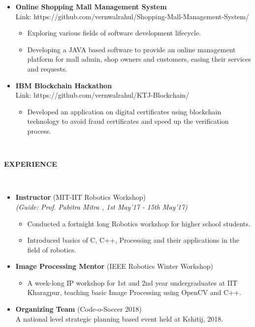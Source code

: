 \documentclass[a4paper,8pt]{article}
\newcommand{\isep}{-2 pt}
\newcommand{\lsep}{-0.5cm}
\newcommand{\resheading}[1]{{\small \colorbox{mygrey}{\begin{minipage}{0.975\textwidth}{\textbf{#1 \vphantom{p\^{E}}}}\end{minipage}}}}
\begin{document}
\begin{itemize}
\item \textbf{Online Shopping Mall Management System} \hspace{0.5cm} \\
Link: {https://github.com/vernwalrahul/Shopping-Mall-Management-System/}
\begin{itemize} \itemsep \isep
\item Exploring various fields of software development lifecycle.	
\item Developing a JAVA based software to provide an online management platform for mall admin, shop owners and customers, easing their services and requests.
\end{itemize}
	
\item \textbf{IBM Blockchain Hackathon} \\
Link: {https://github.com/vernwalrahul/KTJ-Blockchain/}
\begin{itemize} \itemsep \isep
\item Developed an application on digital certificates using blockchain technology to avoid fraud certificates and speed up the verification process. 
\end{itemize}
\end{itemize}


\hspace{0.5cm}\\[-0.2cm]
\resheading{\textbf{ EXPERIENCE } }\\[\lsep]
\begin{itemize}
\item \textbf{Instructor} (MIT-IIT Robotics Workshop) \hspace{0.5cm}\\ 
\emph{(Guide: Prof. Pabitra Mitra
, 1st May'17 - 15th May'17)} \\[-0.6cm] 
\begin{itemize} \itemsep \isep
\item Conducted a fortnight long Robotics workshop for higher school students.
\item Introduced basics of C, C++, Processing and their applications in the field of robotics. \\
\end{itemize} 

\item \textbf{Image Processing Mentor} (IEEE Robotics Winter Workshop) \\
\begin{itemize}
\item A week-long IP workshop for 1st and 2nd year undergraduates at IIT Kharagpur, teaching basic Image Processing using OpenCV and C++.
\end{itemize}

\item \textbf{Organizing Team} (Code-o-Soccer 2018) \\
	A national level strategic planning based event held at Kshitij, 2018.	

\end{itemize}
\end{document}
